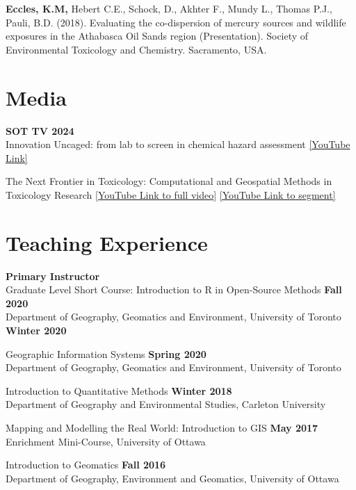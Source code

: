 \documentclass[margin,line]{res}
\begin{document}
\begin{resume}
\begin{etaremune}[start=12]
\item \textbf{Eccles, K.M,} Hebert C.E., Schock, D., Akhter F., Mundy L., Thomas P.J., Pauli, B.D. (2018). Evaluating the co-dispersion of mercury sources and wildlife exposures in the Athabasca Oil Sands region (Presentation). Society of Environmental Toxicology and Chemistry. Sacramento, USA.

\end{etaremune}

\vspace*{.1in}
\section{\sc Media}
\textbf{SOT TV 2024}\\
Innovation Uncaged: from lab to screen in chemical hazard assessment \href{https://www.youtube.com/watch?v=6Pg7DvoHgP0}{[YouTube Link]}

The Next Frontier in Toxicology: Computational and Geospatial Methods in Toxicology Research \href{https://www.youtube.com/watch?v=-vlSMeWfeKs\&t=939s}{[YouTube Link to full video]}
\href{https://www.youtube.com/watch?v=vgu6d1uT8K4}{[YouTube Link to segment]}


\vspace*{.1in}
\section{\sc Teaching Experience}
\textbf{Primary Instructor}\\
Graduate Level Short Course: Introduction to R in Open-Source Methods \hfill {\textbf{Fall 2020}}\\
Department of Geography, Geomatics and Environment, University of Toronto \hfill {\textbf{Winter 2020}}

Geographic Information Systems \hfill {\textbf{Spring 2020}}\\
Department of Geography, Geomatics and Environment, University of Toronto

Introduction to Quantitative Methods
 \hfill {\textbf{Winter 2018}}\\
Department of Geography and Environmental Studies, Carleton University

Mapping and Modelling the Real World: Introduction to GIS \hfill {\textbf{May 2017}}\\
Enrichment Mini-Course, University of Ottawa

Introduction to Geomatics
\hfill {\textbf{Fall 2016}}\\
Department of Geography, Environment and Geomatics, University of Ottawa


\end{resume}
\end{document}

